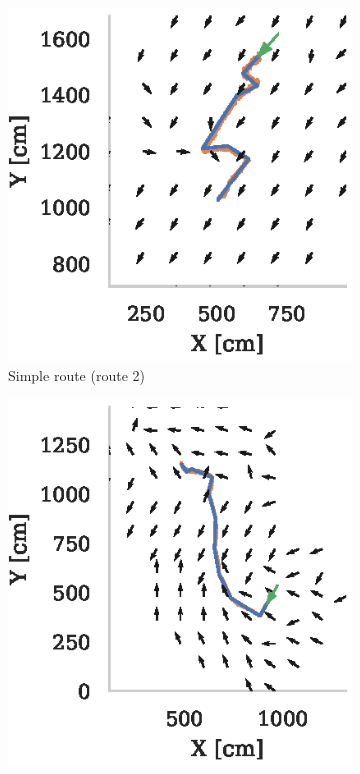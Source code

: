 \documentclass[letterpaper]{article}
\begin{document}
\begin{figure}[t]
    \centering
    \begin{subfigure}[t]{0.3\textwidth}
        \includegraphics{figures/vector_field_route2_PerfectMemory_mask.eps}
        \caption{Simple route (route 2)}
        \label{fig:vector_fields/route2_perfect_memory_mask}
    \end{subfigure}
    \begin{subfigure}[t]{0.3\textwidth}
        \includegraphics{figures/vector_field_route5_PerfectMemory_mask.eps}

\end{subfigure}
\end{figure}
\end{document}
